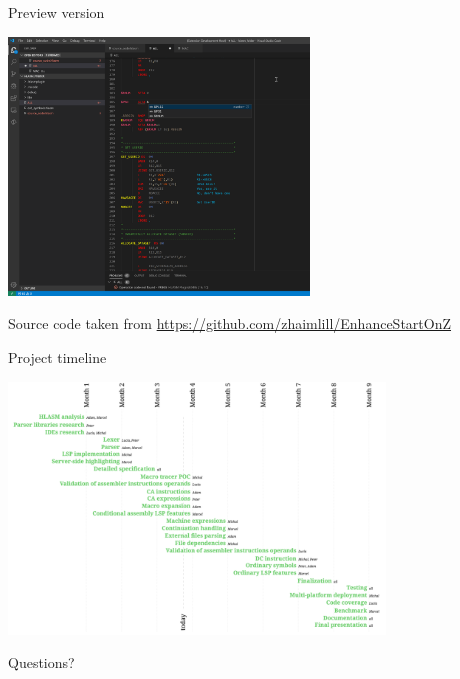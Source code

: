 \documentclass[10pt]{beamer}
\begin{document}
\begin{frame}[fragile]{Preview version}

\centering
\includegraphics[width=8cm]{img/screenshot}

\small
Source code taken from \url{https://github.com/zhaimlill/EnhanceStartOnZ}

\end{frame}


\begin{frame}[fragile]{Project timeline}

\centering
\includegraphics[width=10cm]{img/timeline}

\end{frame}


\begin{frame}[standout]
  Questions?
\end{frame}
\end{document}
